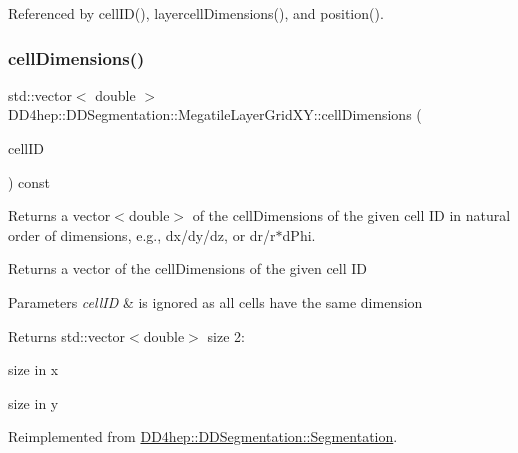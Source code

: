 Referenced by cell\+I\+D(), layercell\+Dimensions(), and position().

\hypertarget{class_d_d4hep_1_1_d_d_segmentation_1_1_megatile_layer_grid_x_y_ae5a4d3e66dc61711c51261818429fd75}{}\label{class_d_d4hep_1_1_d_d_segmentation_1_1_megatile_layer_grid_x_y_ae5a4d3e66dc61711c51261818429fd75} 
\subsubsection{\texorpdfstring{cell\+Dimensions()}{cellDimensions()}}
{\footnotesize\ttfamily std\+::vector$<$ double $>$ D\+D4hep\+::\+D\+D\+Segmentation\+::\+Megatile\+Layer\+Grid\+X\+Y\+::cell\+Dimensions (\begin{DoxyParamCaption}\item[{const \hyperlink{namespace_d_d4hep_1_1_d_d_segmentation_ac7af071d85cb48820914434a07e21ba1}{Cell\+ID} \&}]{cell\+ID }\end{DoxyParamCaption}) const\hspace{0.3cm}{\ttfamily [virtual]}}



Returns a vector$<$double$>$ of the cell\+Dimensions of the given cell ID in natural order of dimensions, e.\+g., dx/dy/dz, or dr/r$\ast$d\+Phi. 

Returns a vector of the cell\+Dimensions of the given cell ID 
\begin{DoxyParams}{Parameters}
{\em cell\+ID} & is ignored as all cells have the same dimension \\
\hline
\end{DoxyParams}
\begin{DoxyReturn}{Returns}
std\+::vector$<$double$>$ size 2\+:
\begin{DoxyEnumerate}
\item size in x
\item size in y 
\end{DoxyEnumerate}
\end{DoxyReturn}


Reimplemented from \hyperlink{class_d_d4hep_1_1_d_d_segmentation_1_1_segmentation_ac2119ba64c9805751e08b6100ef6fee6}{D\+D4hep\+::\+D\+D\+Segmentation\+::\+Segmentation}.



